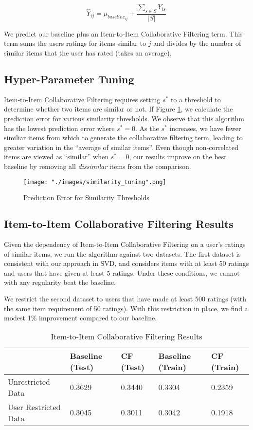 \documentclass[12pt]{article}
\begin{document}
$$ \hat Y_{ij} = \mu_{baseline_{ij}} + \frac{\sum\limits_{s \in S} Y_{is}}{|S|}$$

We predict our baseline plus an Item-to-Item Collaborative Filtering term.\textsuperscript{\cite{gower}} This term sums the users ratings for items similar to $j$ and divides by the number of similar items that the user has rated (takes an average).

\subsection*{Hyper-Parameter Tuning}
Item-to-Item Collaborative Filtering requires setting $s^*$ to a threshold to determine whether two items are similar or not. If Figure \ref{fig:similarity_tuning}, we calculate the prediction error for various similarity thresholds. We observe that this algorithm has the lowest prediction error where $s^* = 0$. As the $s^*$ increases, we have fewer similiar items from which to generate the collaborative filtering term, leading to greater variation in the ``average of similar items''. Even though non-correlated items are viewed as ``similar'' when $s^* = 0$, our results improve on the best baseline by removing all \textit{dissimilar} items from the comparison.

\begin{figure}[!ht]
\centering
    \texttt{[image: "./images/similarity\_tuning".png]}
    \caption{Prediction Error for Similarity Thresholds}
    \label{fig:similarity_tuning}
\end{figure}

\subsection*{Item-to-Item Collaborative Filtering Results}

Given the dependency of Item-to-Item Collaborative Filtering on a user's ratings of similar items, we run the algorithm against two datasets. The first dataset is consistent with our approach in SVD, and considers items with at least 50 ratings and users that have given at least 5 ratings. Under these conditions, we cannot with any regularity beat the baseline.

We restrict the second dataset to users that have made at least 500 ratings (with the same item requirement of 50 ratings). With this restriction in place, we find a modest 1\% improvement compared to our baseline.

\begin{table}[ht!]
\centering
\caption{Item-to-Item Collaborative Filtering Results}
\label{my-label}
\begin{tabular}{lllll}
\hline
                        & Baseline (Test) & CF (Test) & Baseline (Train) & CF (Train) \\ \hline
Unrestricted Data     & 0.3629             & 0.3440                  & 0.3304              & 0.2359                   \\
User Restricted Data  & 0.3045             & 0.3011                  & 0.3042              & 0.1918                   \\ \hline
\end{tabular}
\end{table}
\end{document}

